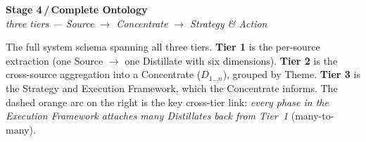 \documentclass[11pt]{article}
\newcommand{\stage}[3]{%
    {\Large\color{accent}\textbf{Stage #1\,/\,#2}}\\[2pt]
    {\color{soft}\itshape #3}\par\vspace{8pt}%
}
\begin{document}
\stage{4}{Complete Ontology}{three tiers — Source $\longrightarrow$ Concentrate $\longrightarrow$ Strategy \& Action}

The full system schema spanning all three tiers. \textbf{Tier 1} is the
per-source extraction (one Source $\to$ one Distillate with six dimensions).
\textbf{Tier 2} is the cross-source aggregation into a Concentrate
($D_{1\ldots n}$), grouped by Theme. \textbf{Tier 3} is the Strategy and
Execution Framework, which the Concentrate informs. The dashed orange arc on
the right is the key cross-tier link: \emph{every phase in the Execution
Framework attaches many Distillates back from Tier~1} (many-to-many).
\end{document}
